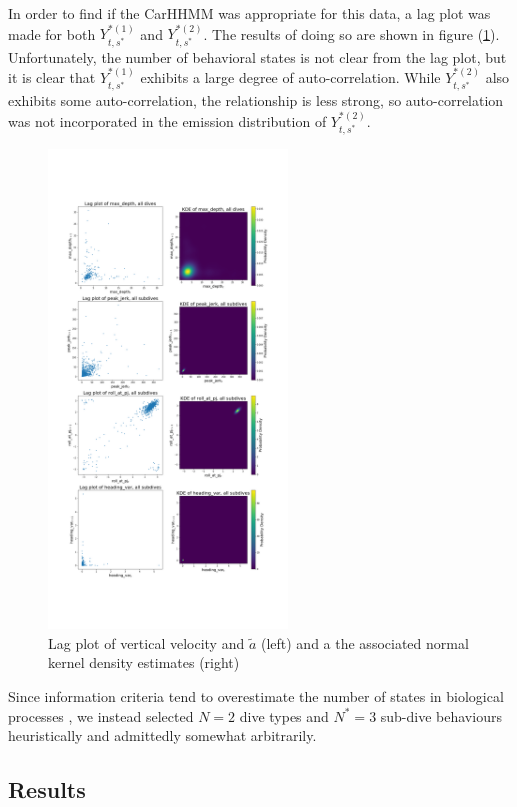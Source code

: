 In order to find if the CarHHMM was appropriate for this data, a lag plot was made for both $Y^{*(1)}_{t,s^*}$ and $Y^{*(2)}_{t,s^*}$. The results of doing so are shown in figure (\ref{fig:lag}). Unfortunately, the number of behavioral states is not clear from the lag plot, but it is clear that $Y^{*(1)}_{t,s^*}$ exhibits a large degree of auto-correlation. While $Y^{*(2)}_{t,s^*}$ also exhibits some auto-correlation, the relationship is less strong, so auto-correlation was not incorporated in the emission distribution of $Y^{*(2)}_{t,s^*}$. 

\begin{figure}[h!]
	\centering
	\includegraphics[height=5in]{../Plots/lagplot.png}
	\caption{Lag plot of vertical velocity and $\tilde a$ (left) and a the associated normal kernel density estimates (right)}
	\label{fig:lag}
\end{figure}

Since information criteria tend to overestimate the number of states in biological processes \cite{Pohle:2017}, we instead selected $N = 2$ dive types and $N^* = 3$ sub-dive behaviours heuristically and admittedly somewhat arbitrarily.

\subsection{Results}

